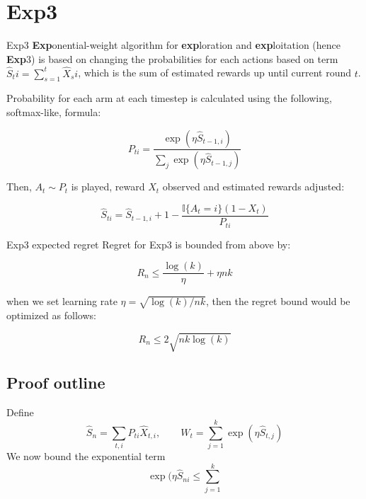 \documentclass[aspectratio=169,xcolor=dvipsnames]{beamer}
\begin{document}
\section{Exp3}
\begin{frame}{Exp3}
    \textbf{Exp}onential-weight algorithm for \textbf{exp}loration and \textbf{exp}loitation (hence \textbf{Exp}3) is based on changing the probabilities for each actions based on term $\hat{S}_ti = \sum_{s=1}^{t} \hat{X}_si$, which is the sum of estimated rewards up until current round $t$.

    Probability for each arm at each timestep is calculated using the following, softmax-like, formula:

    \begin{equation}
        P_{ti} = \frac{\exp(\eta \hat{S}_{t-1, i})}{\sum_{j} \exp(\eta \hat{S}_{t-1, j})}
    \end{equation}

    Then, $A_t \sim P_t$ is played, reward $X_t$ observed and estimated rewards adjusted:

    \begin{equation}
        \hat{S}_{ti} = \hat{S}_{t-1, i} + 1 - \frac{\mathbb{I}\{ A_t = i \}(1 - X_t)}{P_{ti}}
    \end{equation}
\end{frame}

\begin{frame}{Exp3 expected regret}
    Regret for Exp3 is bounded from above by:

    \begin{equation}
        R_n \leq \frac{\log (k)}{\eta} + \eta nk
    \end{equation}

    when we set learning rate $\eta = \sqrt{\log(k)/nk}$, then the regret bound would be optimized as follows:

    \begin{equation}
        R_n \leq 2 \sqrt{nk \log(k)}
    \end{equation}
\end{frame}

\subsection{Proof outline}
\begin{frame}
  Define
  \[ 
    \hat{S}_n = \sum_{t, i} P_{ti} \hat{X}_{t,i},
    \qquad
    W_t = \sum_{j=1}^k \exp\left(\eta \hat{S}_{t,j}\right)
  \]
  \pause
  We now bound the exponential term
  \[
    \exp(\eta \hat{S}_{ni} \leq \sum_{j=1}^k 
  \]
\end{frame}
\end{document}
